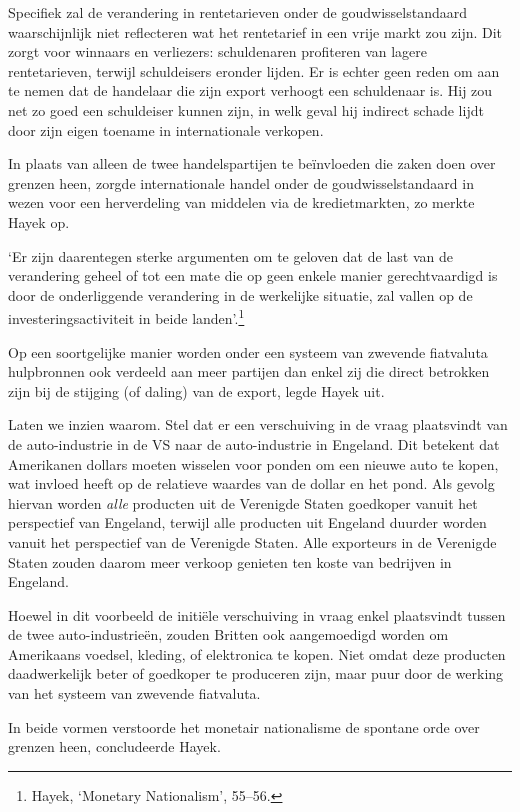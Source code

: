 \documentclass[smalldemyvopaper,11pt,twoside,onecolumn,openright,extrafontsizes,hidelinks]{memoir}
\begin{document}
Specifiek zal de verandering in rentetarieven onder de
goudwisselstandaard waarschijnlijk niet reflecteren wat het rentetarief
in een vrije markt zou zijn. Dit zorgt voor winnaars en verliezers:
schuldenaren profiteren van lagere rentetarieven, terwijl schuldeisers
eronder lijden. Er is echter geen reden om aan te nemen dat de handelaar
die zijn export verhoogt een schuldenaar is. Hij zou net zo goed een
schuldeiser kunnen zijn, in welk geval hij indirect schade lijdt door
zijn eigen toename in internationale verkopen.

In plaats van alleen de twee handelspartijen te beïnvloeden die zaken
doen over grenzen heen, zorgde internationale handel onder de
goudwisselstandaard in wezen voor een herverdeling van middelen via de
kredietmarkten, zo merkte Hayek op.

`Er zijn daarentegen sterke argumenten om te geloven dat de last van de
verandering geheel of tot een mate die op geen enkele manier
gerechtvaardigd is door de onderliggende verandering in de werkelijke
situatie, zal vallen op de investeringsactiviteit in beide
landen'.\footnote{\hspace{0pt}Hayek, `Monetary Nationalism', 55--56.}

Op een soortgelijke manier worden onder een systeem van zwevende
fiatvaluta hulpbronnen ook verdeeld aan meer partijen dan enkel zij die
direct betrokken zijn bij de stijging (of daling) van de export, legde
Hayek uit.

Laten we inzien waarom. Stel dat er een verschuiving in de vraag
plaatsvindt van de auto-industrie in de VS naar de auto-industrie in
Engeland. Dit betekent dat Amerikanen dollars moeten wisselen voor
ponden om een nieuwe auto te kopen, wat invloed heeft op de relatieve
waardes van de dollar en het pond. Als gevolg hiervan worden \emph{alle}
producten uit de Verenigde Staten goedkoper vanuit het perspectief van
Engeland, terwijl alle producten uit Engeland duurder worden vanuit het
perspectief van de Verenigde Staten. Alle exporteurs in de Verenigde
Staten zouden daarom meer verkoop genieten ten koste van bedrijven in
Engeland.

Hoewel in dit voorbeeld de initiële verschuiving in vraag enkel
plaatsvindt tussen de twee auto-industrieën, zouden Britten ook
aangemoedigd worden om Amerikaans voedsel, kleding, of elektronica te
kopen. Niet omdat deze producten daadwerkelijk beter of goedkoper te
produceren zijn, maar puur door de werking van het systeem van zwevende
fiatvaluta.

In beide vormen verstoorde het monetair nationalisme de spontane orde
over grenzen heen, concludeerde Hayek.
\end{document}
